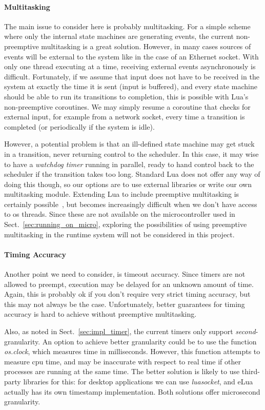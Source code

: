 \paragraph{Multitasking} The main issue to consider here is probably multitasking. For a simple scheme where only the internal state machines are generating events, the current non-preemptive multitasking is a great solution. However, in many cases sources of events will be external to the system like in the case of an Ethernet socket. With only one thread executing at a time, receiving external events asynchronously is difficult. Fortunately, if we assume that input does not have to be received in the system at exactly the time it is sent (input is buffered), and every state machine should be able to run its transitions to completion, this is possible with Lua's non-preemptive coroutines. We may simply resume a coroutine that checks for external input, for example from a network socket, every time a transition is completed (or periodically if the system is idle).

\noindent
However, a potential problem is that an ill-defined state machine may get stuck in a transition, never returning control to the scheduler. In this case, it may wise to have a \emph{watchdog timer} running in parallel, ready to hand control back to the scheduler if the transition takes too long. Standard Lua does not offer any way of doing this though, so our options are to use external libraries or write our own multitasking module. Extending Lua to include preemptive multitasking is certainly possible~\cite{techreport:lua_concurrent}, but becomes increasingly difficult when we don't have access to \gls{os} threads. Since these are not available on the microcontroller used in Sect.~\ref{sec:running_on_micro}, exploring the possibilities of using preemptive multitasking in the runtime system will not be considered in this project.

\paragraph{Timing Accuracy} Another point we need to consider, is timeout accuracy. Since timers are not allowed to preempt, execution may be delayed for an unknown amount of time. Again, this is probably ok if you don't require very strict timing accuracy, but this may not always be the case. Unfortunately, better guarantees for timing accuracy is hard to achieve without preemptive multitasking.

\noindent
Also, as noted in Sect.~\ref{sec:impl_timer}, the current timers only support \emph{second}-granularity. An option to achieve better granularity could be to use the function \emph{os.clock}, which measures time in milliseconds. However, this function attempts to measure \gls{cpu} time, and may be inaccurate with respect to real time if other processes are running at the same time. The better solution is likely to use third-party libraries for this: for desktop applications we can use \emph{luasocket}, and eLua actually has its own timestamp implementation. Both solutions offer microsecond granularity.

